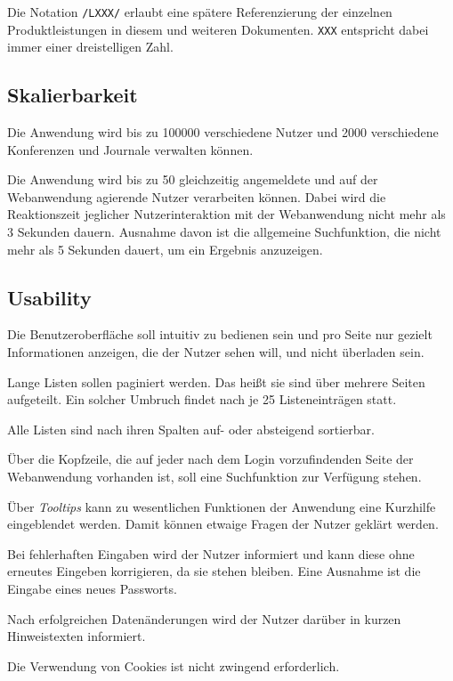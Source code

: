 
Die Notation \texttt{/LXXX/} erlaubt eine spätere Referenzierung der einzelnen Produktleistungen in diesem und weiteren
Dokumenten. \texttt{XXX} entspricht dabei immer einer dreistelligen Zahl.

\subsection{Skalierbarkeit}

\begin{description}

	 Die Anwendung wird bis zu 100000 verschiedene Nutzer und 2000 verschiedene Konferenzen und Journale verwalten können.

	 Die Anwendung wird bis zu 50 gleichzeitig angemeldete und auf der Webanwendung agierende Nutzer verarbeiten können. Dabei wird die Reaktionszeit jeglicher Nutzerinteraktion mit der Webanwendung nicht mehr als 3 Sekunden dauern. Ausnahme davon ist die allgemeine Suchfunktion, die nicht mehr als 5 Sekunden dauert, um ein Ergebnis anzuzeigen.

\end{description}

\subsection{Usability}

\begin{description}
	 Die Benutzeroberfläche soll intuitiv zu bedienen sein und pro Seite nur gezielt Informationen anzeigen, die der Nutzer sehen will, und nicht überladen sein.

	 Lange Listen sollen paginiert werden. Das heißt sie sind über mehrere Seiten aufgeteilt. Ein solcher Umbruch findet nach je 25 Listeneinträgen statt.

	 Alle Listen sind nach ihren Spalten auf- oder absteigend sortierbar.

	 Über die Kopfzeile, die auf jeder nach dem Login vorzufindenden Seite der Webanwendung
	vorhanden ist, soll eine Suchfunktion zur Verfügung stehen.

	 Über \emph{Tooltips} kann zu wesentlichen Funktionen der Anwendung eine Kurzhilfe eingeblendet werden. Damit können etwaige Fragen der Nutzer geklärt werden.

	 Bei fehlerhaften Eingaben wird der Nutzer informiert und kann diese ohne erneutes Eingeben korrigieren, da sie stehen bleiben. Eine Ausnahme ist die Eingabe eines neues Passworts.

	 Nach erfolgreichen Datenänderungen wird der Nutzer darüber in kurzen Hinweistexten informiert.

	 Die Verwendung von Cookies ist nicht zwingend erforderlich.
\end{description}

